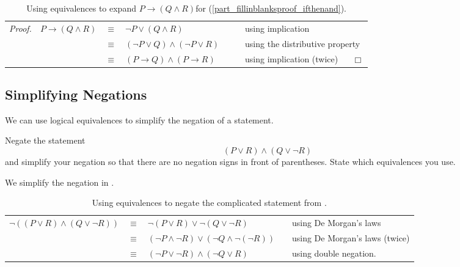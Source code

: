 \begin{exam}
\begin{apart}
        \begin{table}[hbtp]
            \centering
            \begin{tabular} {crclll}
                \emph{Proof.} & $P \to (Q \land R)$ & $\equiv$ & $\neg P \lor (Q \land R)$ & ~\hspace{.25in}~& using implication  \\ 
                && $\equiv$ & $(\neg P \lor Q) \land (\neg P \lor R)$ && using the distributive property \\ 
                && $\equiv$ & $(P \to Q) \land (P \to R)$ && using implication (twice) ~ \hfill ~$\Box$ \\ 
            \end{tabular}
            \caption{Using equivalences to expand $P \to (Q \land R)$for  (\ref{part_fillinblanksproof_ifthenand}).}
            \label{tab_fillinblanksproof_ifthenand_answers}
        \end{table}
    \end{apart}
\end{exam}

\newcommand{\subneg}{Simplifying Negations}
\subsection{\subneg}
\label{sub_simplify_neg}

We can use logical equivalences to simplify the negation of a statement.

\begin{exam} 
\label{exam_neg_complicated}
    Negate the statement $$(P \lor R) \land (Q \lor\neg R)$$ and simplify your negation so that there are no negation signs in front of parentheses. State which equivalences you use.
        \begin{soln}
            We simplify the negation in .
        \end{soln}

        \begin{table}[hbtp]
            \centering
            \begin{tabular} {rclll}
                $\neg ((P \lor R) \land (Q \lor \neg R))$ & $\equiv$ & $\neg (P \lor R) \lor \neg (Q \lor \neg R)$ && using De Morgan's laws\\
                & $\equiv$ & $(\neg P \land \neg R) \lor (\neg Q \land \neg (\neg R))$ && using De Morgan's laws (twice) \\
                & $\equiv$ & $(\neg P \lor \neg R) \land (\neg Q \lor R)$ &&  using double negation.
            \end{tabular}
            \caption{Using equivalences to negate the complicated statement from .}
            \label{tab_neg_complicated}
        \end{table}
\end{exam}

